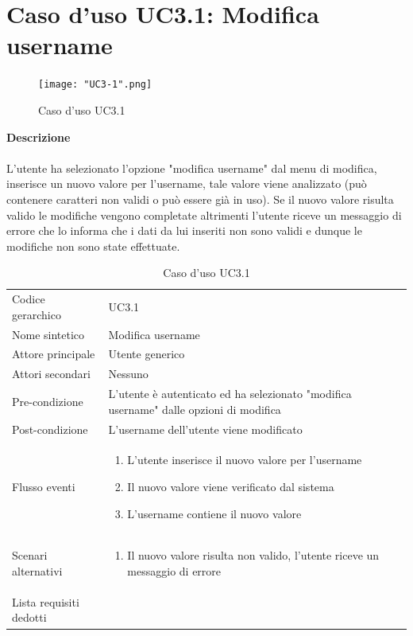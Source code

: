 \documentclass[a4paper]{report}
\begin{document}
	 \section{Caso d'uso UC3.1: Modifica username}
	 	\begin{figure}[H]
			\centering
			\texttt{[image: "UC3-1".png]}
			\caption{Caso d'uso UC3.1}
		\end{figure}
	 \textbf{Descrizione} \\ \\
	 L'utente ha selezionato l'opzione "modifica username" dal menu di modifica, inserisce un nuovo valore
	 per l'username, tale valore viene analizzato (può contenere caratteri non validi o può essere già 
	 in uso). Se il nuovo valore risulta valido le modifiche vengono completate altrimenti l'utente riceve 
	 un messaggio di errore che lo informa che i dati da lui inseriti non sono validi e dunque le modifiche non
	 sono state effettuate.
		\begin{table}[H]
		\begin{tabularx}{\textwidth}{X | X}\toprule
			\rowcolor{orange!65}Codice gerarchico & UC3.1 \\
			Nome sintetico & Modifica username \\
			\rowcolor{orange!65}Attore principale & Utente generico\\
			Attori secondari & Nessuno \\
			\rowcolor{orange!65}Pre-condizione & L'utente è autenticato ed ha selezionato "modifica
			 username" dalle opzioni di modifica\\
			Post-condizione & L'username dell'utente viene modificato \\
			\rowcolor{orange!65}Flusso eventi & \begin{enumerate}
			\item L'utente inserisce il nuovo valore per l'username
			\item Il nuovo valore viene verificato dal sistema
			\item L'username contiene il nuovo valore
			\end{enumerate} \\
			Scenari alternativi & \begin{enumerate}
			\item Il nuovo valore risulta non valido, l'utente riceve un messaggio di errore
			\end{enumerate} \\
			\rowcolor{orange!65}Lista requisiti dedotti & \\
			\bottomrule
		\end{tabularx}
		\caption{Caso d'uso UC3.1}
	 \end{table}
\end{document}
